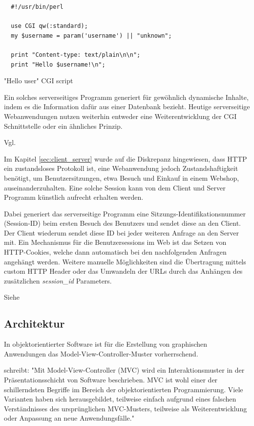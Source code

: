 \begin{listing}[H]
\begin{verbatim}
  #!/usr/bin/perl

  use CGI qw(:standard);
  my $username = param('username') || "unknown";

  print "Content-type: text/plain\n\n";
  print "Hello $username!\n";
\end{verbatim}
\caption{"Hello user" CGI script}
\label{lst:hello_pl}
\end{listing}

Ein solches serverseitiges Programm generiert für gewöhnlich dynamische Inhalte, indem es die Information dafür aus einer Datenbank bezieht. Heutige serverseitige Webanwendungen nutzen weiterhin entweder eine Weiterentwicklung der CGI Schnittstelle oder ein ähnliches Prinzip.

Vgl. \cite[Kap. 1.1]{Bekman:2003}

Im Kapitel \ref{sec:client_server} wurde auf die Diskrepanz hingewiesen, dass HTTP ein zustandsloses Protokoll ist, eine Webanwendung jedoch Zustandshaftigkeit benötigt, um Benutzersitzungen, etwa Besuch und Einkauf in einem Webshop, auseinanderzuhalten. Eine solche Session kann von dem Client und Server Programm
künstlich aufrecht erhalten werden.

Dabei generiert das serverseitige Programm eine Sitzungs-Identifikationsnummer (Session-ID) beim ersten Besuch des Benutzers und sendet diese an den Client. Der Client wiederum sendet diese  ID bei jeder weiteren Anfrage an den Server mit. Ein Mechanismus für die Benutzersessions im Web ist das Setzen von HTTP-Cookies, welche dann automatisch bei den nachfolgenden Anfragen angehängt werden. Weitere manuelle Möglichkeiten sind die Übertragung mittels custom HTTP Header oder das Umwandeln der URLs durch das Anhängen des zusätzlichen \emph{session\_id} Parameters.

Siehe \cite[Stateful Web Applications]{Parikh:2015}

\subsection{Architektur}

In objektorientierter Software ist für die Erstellung von graphischen Anwendungen das Model-View-Controller-Muster vorherrschend.

\cite{lahres2009objektorientierte} schreibt: "Mit Model-View-Controller (MVC) wird ein Interaktionsmuster in der Präsentationsschicht von Software beschrieben. MVC ist wohl einer der schillerndsten Begriffe im Bereich der objektorientierten Programmierung. Viele Varianten haben sich herausgebildet, teilweise einfach aufgrund eines falschen Verständnisses des ursprünglichen MVC-Musters, teilweise als Weiterentwicklung oder Anpassung an neue Anwendungsfälle."

